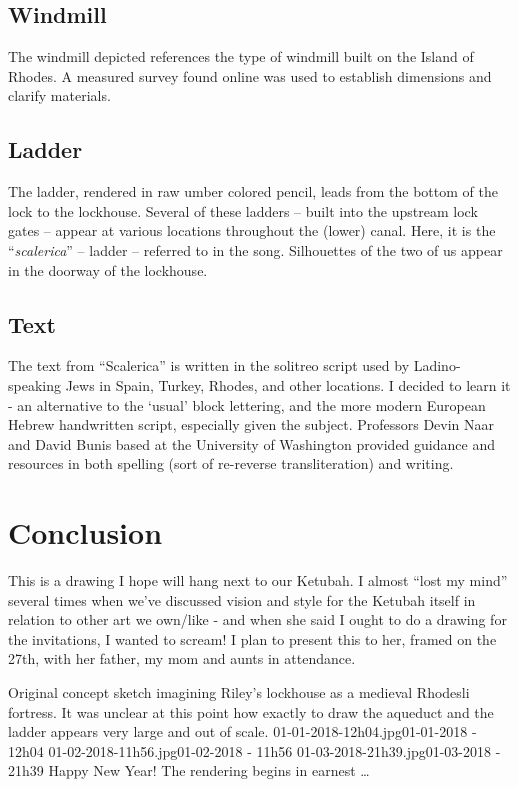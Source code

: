 ﻿\documentclass[letterpaper, 12pt, landscape]{ProgressBook}
\begin{document}
\subsection*{Windmill}

The windmill depicted references the type of windmill built on the
Island of Rhodes. A measured survey found online was used to establish
dimensions and clarify materials.

\subsection*{Ladder}

The ladder, rendered in raw umber colored pencil, leads from the
bottom of the lock to the lockhouse. Several of these ladders – built into the
upstream lock gates – appear at various locations throughout the (lower) canal.
Here, it is the ``\textit{scalerica}'' -- ladder -- referred to in the song. Silhouettes of the two of
us appear in the doorway of the lockhouse.

\subsection*{Text}

The text from ``Scalerica'' is written in the solitreo script used
by Ladino-speaking Jews in Spain, Turkey, Rhodes, and other locations. I
decided to learn it - an alternative to the ‘usual’ block lettering, and the
more modern European Hebrew handwritten script, especially given the subject.
Professors Devin Naar and David Bunis based at the University of Washington
provided guidance and resources in both spelling (sort of re-reverse
transliteration) and writing.

\section*{Conclusion}

This is a drawing I hope will hang next to our Ketubah. I almost
``lost my mind'' several times when we've discussed vision and style for the
Ketubah itself in relation to other art we own/like - and when she said I ought to do a drawing for the invitations, I wanted to scream! I plan to present this to
her, framed on the 27th, with her father, my mom and aunts in attendance.

\eject

{Original concept sketch imagining Riley's lockhouse as a medieval Rhodesli fortress. It was unclear at this point how exactly to draw the aqueduct and the ladder appears very large and out of scale.}
{01-01-2018-12h04.jpg}{01-01-2018 - 12h04}
{01-02-2018-11h56.jpg}{01-02-2018 - 11h56}
{01-03-2018-21h39.jpg}{01-03-2018 - 21h39}
{Happy New Year! The rendering begins in earnest \ldots}
\end{document}

